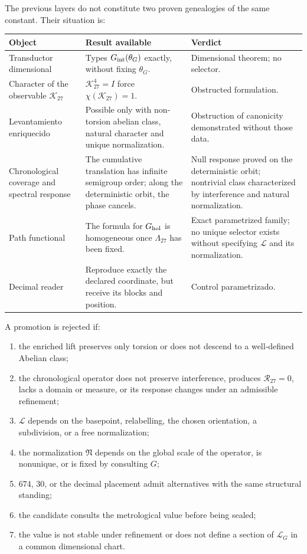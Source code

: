 The previous layers do not constitute two proven genealogies of the same constant. Their situation is:
\begin{center}
\begin{tabularx}{0.96\textwidth}{@{}L{0.25\textwidth}Y L{0.26\textwidth}@{}}
\toprule
Object & Result available & Verdict\\
\midrule
Transductor dimensional &
Types \(G_{\rm int}(\theta_G)\) exactly, without fixing \(\theta_G\). &
Dimensional theorem; no selector.\\
Character of the observable \(\mathcal K_{27}\) &
\(\mathcal K_{27}^4=I\) force
\(\chi(\mathcal K_{27})=1\). &
Obstructed formulation.\\
Levantamiento enriquecido &
Possible only with non-torsion abelian class, natural character and unique normalization. &
Obstruction of canonicity demonstrated without those data.\\
Chronological coverage and spectral response &
The cumulative translation has infinite semigroup order; along the deterministic
orbit, the phase cancels. &
Null response proved on the deterministic orbit; nontrivial class
characterized by interference and natural normalization.\\
Path functional &
The formula for \(G_{\rm hol}\) is homogeneous once
\(\Lambda_{27}\) has been fixed. &
Exact parametrized family; no unique selector exists without specifying
\(\mathscr L\) and its normalization.\\
Decimal reader &
Reproduce exactly the declared coordinate, but receive its blocks and
position. &
Control parametrizado.\\
\bottomrule
\end{tabularx}
\end{center}

\begin{criterion}
\label{crit:selector-G}
A promotion is rejected if:
\begin{enumerate}
 \item the enriched lift preserves only torsion or does not descend
 to a well-defined Abelian class;
 \item the chronological operator does not preserve interference, produces
 \(\mathcal R_{27}=0\), lacks a domain or measure, or its response changes under
 an admissible refinement;
 \item \(\mathscr L\) depends on the basepoint, relabelling, the
 chosen orientation, a subdivision, or a free normalization;
 \item the normalization \(\mathfrak N\) depends on the global scale of
the operator, is nonunique, or is fixed by consulting \(G\);
 \item \(674\), \(30\), or the decimal placement admit alternatives with the
 same structural standing;
 \item the candidate consults the metrological value before being sealed;
 \item the value is not stable under refinement or does not define a
section of \(\mathcal L_G\) in a common dimensional chart.
\end{enumerate}
\end{criterion}

